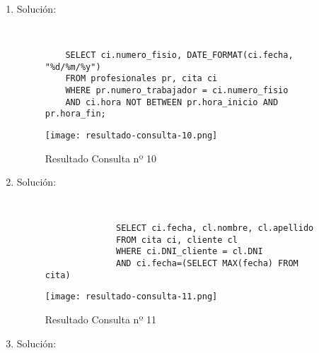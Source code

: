 \begin{enumerate}
    \item Solución:

    \begin{figure}[H]
        \begin{tcolorbox}[sharp corners, colback=yellow!30, colframe=white!20]
            \scriptsize
            \begin{verbatim}


    SELECT ci.numero_fisio, DATE_FORMAT(ci.fecha, "%d/%m/%y")
    FROM profesionales pr, cita ci
    WHERE pr.numero_trabajador = ci.numero_fisio
    AND ci.hora NOT BETWEEN pr.hora_inicio AND pr.hora_fin;
            \end{verbatim}
        \end{tcolorbox}
    \end{figure}

    \begin{figure}[H]
        \centering
        \texttt{[image: resultado-consulta-10.png]}
        \caption{Resultado Consulta nº 10}
    \end{figure}

    \item Solución:

    \begin{figure}[H]
        \begin{tcolorbox}[sharp corners, colback=yellow!30, colframe=white!20]
            \scriptsize
            \begin{verbatim}


              SELECT ci.fecha, cl.nombre, cl.apellido
              FROM cita ci, cliente cl
              WHERE ci.DNI_cliente = cl.DNI
              AND ci.fecha=(SELECT MAX(fecha) FROM cita)
            \end{verbatim}
        \end{tcolorbox}
    \end{figure}

    \begin{figure}[H]
        \centering
        \texttt{[image: resultado-consulta-11.png]}
        \caption{Resultado Consulta nº 11}
    \end{figure}

    \item Solución:

    \begin{figure}[H]
        \begin{tcolorbox}[sharp corners, colback=yellow!30, colframe=white!20]
            \scriptsize
            \begin{verbatim}


\end{verbatim}
\end{tcolorbox}
\end{figure}
\end{enumerate}
